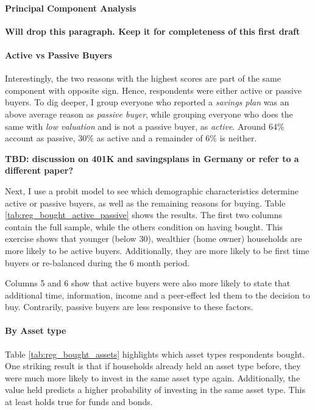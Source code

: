 \documentclass[ProjectABM]{subfiles}
\begin{document}
\paragraph{Principal Component Analysis}
\textbf{Will drop this paragraph. Keep it for completeness of this first draft}



\paragraph{Active vs Passive Buyers}
Interestingly, the two reasons with the highest scores are part of the same component with opposite sign. Hence, respondents were either active or passive buyers. To dig deeper, I group everyone who reported a \textit{savings plan} was an above average reason as \textit{passive buyer}, while grouping everyone who does the same with \textit{low valuation} and is not a passive buyer, as \textit{active}. Around 64\% account as passive, 30\% as active and a remainder of 6\% is neither.

\textbf{TBD: discussion on 401K and savingsplans in Germany or refer to a different paper?}

Next, I use a probit model to see which demographic characteristics determine active or passive buyers, as well as the remaining reasons for buying. Table \ref{tab:reg_bought_active_passive} shows the results. The first two columns contain the full sample, while the others condition on having bought. This exercise shows that younger (below 30), wealthier (home owner) households are more likely to be active buyers. Additionally, they are more likely to be first time buyers or re-balanced during the 6 month period.

Columns 5 and 6 show that active buyers were also more likely to state that additional time, information, income and a peer-effect led them to the decision to buy. Contrarily, passive buyers are less responsive to these factors.




\paragraph{By Asset type}
Table \ref{tab:reg_bought_assets} highlights which asset types respondents bought. One striking result is that if households already held an asset type before, they were much more likely to invest in the same asset type again. Additionally, the value held predicts a higher probability of investing in the same asset type. This at least holds true for funds and bonds. %
\end{document}
